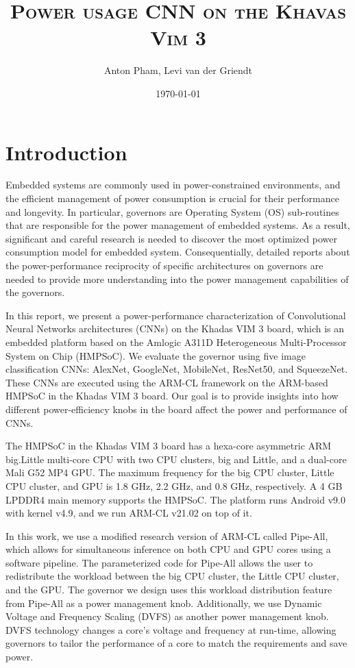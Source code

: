 \documentclass[a4paper, 12pt, fleqn]{article}
\title{\textsc{Power usage CNN on the Khavas Vim 3}}
\author{Anton Pham, Levi van der Griendt}
\date{\today}
\begin{document}
 \maketitle


\section{Introduction}
Embedded systems are commonly used in power-constrained environments, and the efficient management of power consumption is crucial for their performance and longevity. In particular, governors are Operating System (OS) sub-routines that are responsible for the power management of embedded systems. As a result, significant and careful research is needed to discover the most optimized power consumption model for embedded system. Consequentially, detailed reports about the power-performance reciprocity of specific architectures on governors are needed to provide more understanding into the power management capabilities of the governors.

In this report, we present a power-performance characterization of Convolutional Neural Networks architectures (CNNs) on the Khadas VIM 3 board, which is an embedded platform based on the Amlogic A311D Heterogeneous Multi-Processor System on Chip (HMPSoC). We evaluate the governor using five image classification CNNs: AlexNet, GoogleNet, MobileNet, ResNet50, and SqueezeNet. These CNNs are executed using the ARM-CL framework on the ARM-based HMPSoC in the Khadas VIM 3 board. Our goal is to provide insights into how different power-efficiency knobs in the board affect the power and performance of CNNs.


The HMPSoC in the Khadas VIM 3 board has a hexa-core asymmetric ARM big.Little multi-core CPU with two CPU clusters, big and Little, and a dual-core Mali G52 MP4 GPU. The maximum frequency for the big CPU cluster, Little CPU cluster, and GPU is 1.8 GHz, 2.2 GHz, and 0.8 GHz, respectively. A 4 GB LPDDR4 main memory supports the HMPSoC. The platform runs Android v9.0 with kernel v4.9, and we run ARM-CL v21.02 on top of it.

In this work, we use a modified research version of ARM-CL called Pipe-All, which allows for simultaneous inference on both CPU and GPU cores using a software pipeline. The parameterized code for Pipe-All allows the user to redistribute the workload between the big CPU cluster, the Little CPU cluster, and the GPU. The governor we design uses this workload distribution feature from Pipe-All as a power management knob. Additionally, we use Dynamic Voltage and Frequency Scaling (DVFS) as another power management knob. DVFS technology changes a core's voltage and frequency at run-time, allowing governors to tailor the performance of a core to match the requirements and save power.
\end{document}
